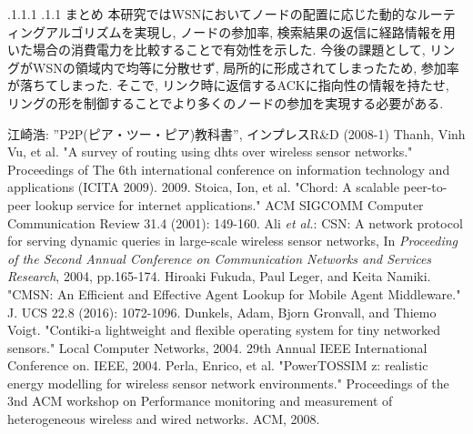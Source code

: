 \documentclass[a4paper, twocolumn]{jarticle}
\makeatletter
\def\section{\@startsection{section}{1}{\z@}%
 {.1\Cvs \@plus.1\Cdp \@minus.1\Cdp}%
 {.1\Cvs \@plus.1\Cdp}%
 {\normalfont\normalsize\bfseries}}
\makeatother
\begin{document}
\section{まとめ}
本研究ではWSNにおいてノードの配置に応じた動的なルーティングアルゴリズムを実現し,
ノードの参加率, 検索結果の返信に経路情報を用いた場合の消費電力を比較することで有効性を示した.
今後の課題として, リングがWSNの領域内で均等に分散せず, 局所的に形成されてしまったため, 参加率が落ちてしまった.
そこで, リンク時に返信するACKに指向性の情報を持たせ, リングの形を制御することでより多くのノードの参加を実現する必要がある. 
\begin{thebibliography}{9}
{\small
江崎浩: ''P2P(ピア・ツー・ピア)教科書'', インプレスR\&D (2008-1)
Thanh, Vinh Vu, et al. "A survey of routing using dhts over wireless sensor networks." Proceedings of The 6th international conference on information technology and applications (ICITA 2009). 2009.
Stoica, Ion, et al. "Chord: A scalable peer-to-peer lookup service for internet applications." ACM SIGCOMM Computer Communication Review 31.4 (2001): 149-160.
Ali {\em et al.}: CSN: A network protocol for serving dynamic queries in large-scale wireless sensor networks, In {\em Proceeding of the Second Annual Conference on Communication Networks and Services Research}, 2004, pp.165-174.
Hiroaki Fukuda, Paul Leger, and Keita Namiki. "CMSN: An Efficient and Effective Agent Lookup for Mobile Agent Middleware." J. UCS 22.8 (2016): 1072-1096.
Dunkels, Adam, Bjorn Gronvall, and Thiemo Voigt. "Contiki-a lightweight and flexible operating system for tiny networked sensors." Local Computer Networks, 2004. 29th Annual IEEE International Conference on. IEEE, 2004.
}
Perla, Enrico, et al. "PowerTOSSIM z: realistic energy modelling for wireless sensor network environments." Proceedings of the 3nd ACM workshop on Performance monitoring and measurement of heterogeneous wireless and wired networks. ACM, 2008.
\end{thebibliography}
\end{document}
